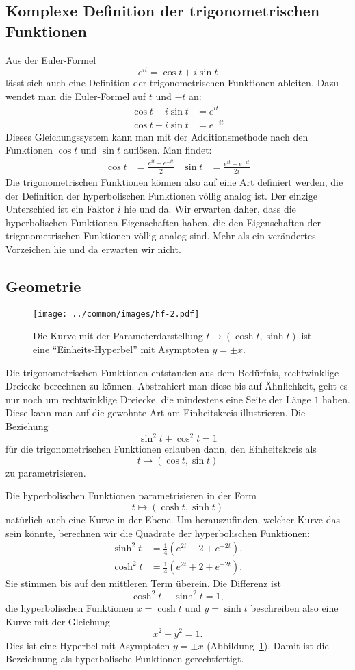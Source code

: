 \documentclass[a4paper,12pt]{article}
\begin{document}
\subsection{Komplexe Definition der trigonometrischen Funktionen}
Aus der Euler-Formel
\[
e^{it}=\cos t+i\sin t
\]
lässt sich auch eine Definition der trigonometrischen Funktionen
ableiten. Dazu wendet man die Euler-Formel auf $t$ und $-t$ an:
\begin{align*}
\cos t+i\sin t&=e^{it}\\
\cos t-i\sin t&=e^{-it}
\end{align*}
Dieses Gleichungssystem kann man mit der Additionsmethode nach den
Funktionen $\cos t$ und $\sin t$ auflösen. Man findet:
\begin{align*}
\cos t
&=
\frac{e^{it}+e^{-it}}2
&
\sin t
&=
\frac{e^{it}-e^{-it}}{2i}
\end{align*}
Die trigonometrischen Funktionen können also auf eine Art definiert werden,
die der Definition der hyperbolischen Funktionen völlig analog ist.
Der einzige Unterschied ist ein Faktor $i$ hie und da.
Wir erwarten daher, dass die hyperbolischen Funktionen Eigenschaften
haben, die den Eigenschaften der trigonometrischen Funktionen völlig
analog sind.
Mehr als ein verändertes Vorzeichen hie und da erwarten wir nicht.


\subsection{Geometrie}
\begin{figure}
\centering
\texttt{[image: ../common/images/hf-2.pdf]}
\caption{Die Kurve mit der Parameterdarstellung
$t\mapsto (\cosh t, \sinh t)$ ist eine ``Einheits-Hyperbel'' mit 
Asymptoten $y=\pm x$.
\label{anhang:hyperbel}}
\end{figure}
Die trigonometrischen Funktionen entstanden aus dem Bedürfnis, 
rechtwinklige Dreiecke berechnen zu können.
Abstrahiert man diese bis auf Ähnlichkeit, geht es nur noch um rechtwinklige
Dreiecke, die mindestens eine Seite der Länge $1$ haben.
Diese kann man auf die gewohnte Art am Einheitskreis illustrieren.
Die Beziehung 
\[
\sin^2t+\cos^2t=1
\]
für die trigonometrischen Funktionen erlauben dann, den Einheitskreis als
\[
t\mapsto (\cos t,\sin t)
\]
zu parametrisieren.

Die hyperbolischen Funktionen parametrisieren in der Form
\[
t\mapsto (\cosh t, \sinh t)
\]
natürlich auch eine Kurve in der Ebene.
Um herauszufinden, welcher Kurve das sein könnte, berechnen wir die 
Quadrate der hyperbolischen Funktionen:
\begin{align}
\sinh^2 t&=\frac14(e^{2t}-2+e^{-2t}),
\\
\cosh^2 t&=\frac14(e^{2t}+2+e^{-2t}).
\label{hyp:definition}
\end{align}
Sie stimmen bis auf den mittleren Term überein.
Die Differenz ist 
\[
\cosh^2t - \sinh^2t=1,
\]
die hyperbolischen Funktionen $x=\cosh t$ und $y=\sinh t$
beschreiben also eine Kurve mit der Gleichung
\[
x^2-y^2=1.
\]
Dies ist eine Hyperbel mit Asymptoten $y=\pm x$
(Abbildung~\ref{anhang:hyperbel}).
Damit ist die Bezeichnung als hyperbolische Funktionen gerechtfertigt.
\end{document}
